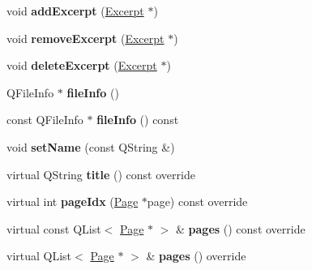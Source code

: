 \begin{DoxyCompactItemize}
\mbox{\label{class_ms_1_1_master_score_a8250966628ceb49786f4ee100e4bf845}} 
void {\bfseries add\+Excerpt} (\hyperlink{class_ms_1_1_excerpt}{Excerpt} $\ast$)
\item 
\mbox{\label{class_ms_1_1_master_score_ac64febb82340941ec3442da58df32a80}} 
void {\bfseries remove\+Excerpt} (\hyperlink{class_ms_1_1_excerpt}{Excerpt} $\ast$)
\item 
\mbox{\label{class_ms_1_1_master_score_a0b2d66e870492a912fee64559f9d329e}} 
void {\bfseries delete\+Excerpt} (\hyperlink{class_ms_1_1_excerpt}{Excerpt} $\ast$)
\item 
\mbox{\label{class_ms_1_1_master_score_afb8fcc1d352ef28a261efd533e8fd1f3}} 
Q\+File\+Info $\ast$ {\bfseries file\+Info} ()
\item 
\mbox{\label{class_ms_1_1_master_score_adf7e20e8c2587fbcb78e3a6dd809051a}} 
const Q\+File\+Info $\ast$ {\bfseries file\+Info} () const
\item 
\mbox{\label{class_ms_1_1_master_score_ac3c0877c2df6fc75a513801ea688a08e}} 
void {\bfseries set\+Name} (const Q\+String \&)
\item 
\mbox{\label{class_ms_1_1_master_score_a89cdb0a9735004f1b1df6f040307c5ea}} 
virtual Q\+String {\bfseries title} () const override
\item 
\mbox{\label{class_ms_1_1_master_score_aa3f8b4ff8ce039852e083503dc8f399b}} 
virtual int {\bfseries page\+Idx} (\hyperlink{class_ms_1_1_page}{Page} $\ast$page) const override
\item 
\mbox{\label{class_ms_1_1_master_score_a8250801f8f048a2140d3c117179c23ae}} 
virtual const Q\+List$<$ \hyperlink{class_ms_1_1_page}{Page} $\ast$ $>$ \& {\bfseries pages} () const override
\item 
\mbox{\label{class_ms_1_1_master_score_af2f4ccd6c074d4a737b8849238773cca}} 
virtual Q\+List$<$ \hyperlink{class_ms_1_1_page}{Page} $\ast$ $>$ \& {\bfseries pages} () override

\end{DoxyCompactItemize}
